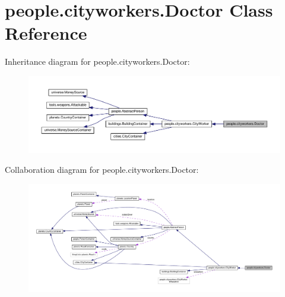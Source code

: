 \hypertarget{classpeople_1_1cityworkers_1_1_doctor}{}\section{people.\+cityworkers.\+Doctor Class Reference}
\label{classpeople_1_1cityworkers_1_1_doctor}


Inheritance diagram for people.\+cityworkers.\+Doctor\+:\nopagebreak
\begin{figure}[H]
\begin{center}
\leavevmode
\includegraphics[width=350pt]{classpeople_1_1cityworkers_1_1_doctor__inherit__graph}
\end{center}
\end{figure}


Collaboration diagram for people.\+cityworkers.\+Doctor\+:\nopagebreak
\begin{figure}[H]
\begin{center}
\leavevmode
\includegraphics[width=350pt]{classpeople_1_1cityworkers_1_1_doctor__coll__graph}
\end{center}
\end{figure}
